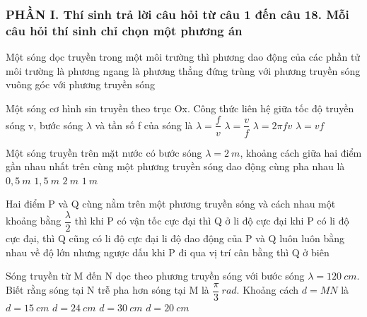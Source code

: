 \subsubsection*{PHẦN I. Thí sinh trả lời câu hỏi từ câu 1 đến câu 18. Mỗi câu hỏi thí sinh chỉ chọn một phương án}
\setcounter{ex}{0}
	\begin{ex}%
		Một sóng dọc truyền trong một môi trường thì phương dao động của các phần tử môi trường
		\choice
		{là phương ngang}
		{là phương thẳng đứng}
		{\True trùng với phương truyền sóng}
		{vuông góc với phương truyền sóng}
	\end{ex}
	
	\begin{ex}%
		
		Một sóng cơ hình sin truyền theo trục Ox. Công thức liên hệ giữa tốc độ truyền sóng v, bước sóng $\lambda$ và tần số f của sóng là
		\choice
		{$\lambda =\dfrac{f}{v}$}
		{\True $\lambda =\dfrac{v}{f}$}
		{$\lambda = 2\pi fv$}
		{$\lambda = vf$}
	\end{ex}
	\begin{ex}%
		Một sóng truyền trên mặt nước có bước sóng $\lambda = 2\ m$, khoảng cách giữa hai điểm gần nhau nhất trên cùng một phương truyền sóng dao động cùng pha nhau là
		\choice
		{$0,5\ m$}
		{$1,5\ m$}
		{\True $2\ m$}
		{$1\ m$}
	\end{ex}
	\begin{ex}%
		Hai điểm P và Q cùng nằm trên một phương truyền sóng và cách nhau một khoảng bằng $\dfrac{\lambda}{2}$ thì
		\choice
		{khi P có vận tốc cực đại thì Q ở li độ cực đại}
		{khi P có li độ cực đại, thì Q cũng có li độ cực đại}
		{\True li độ dao động của P và Q luôn luôn bằng nhau về độ lớn nhưng ngược dấu}
		{khi P đi qua vị trí cân bằng thì Q ở biên}
	\end{ex}
	\begin{ex}%
		Sóng truyền từ M đến N dọc theo phương truyền sóng với bước sóng $\lambda=120\ cm$. Biết rằng sóng tại N trễ pha hơn sóng tại M là $\dfrac{\pi}{3}\ rad$. Khoảng cách $d=MN$ là
		\choice
		{$d=15\ cm$}
		{$d=24\ cm$}
		{$d=30\ cm$}
		{\True $d=20\ cm$}
	\end{ex}

